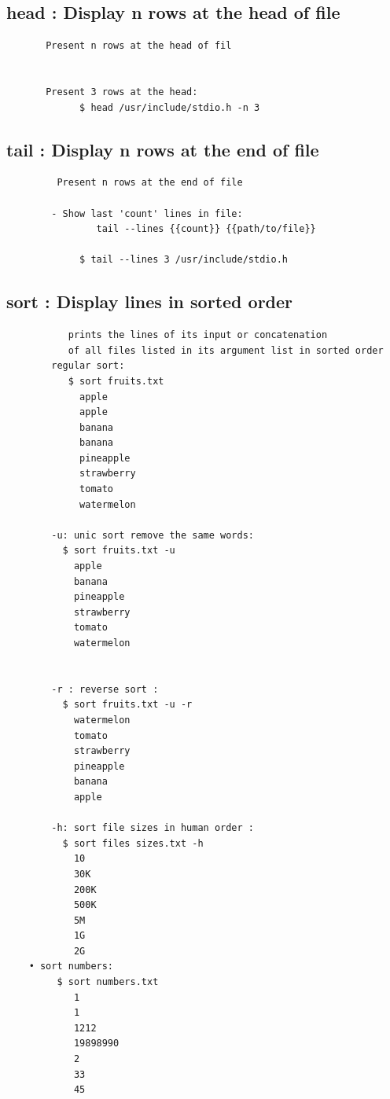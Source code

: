 \documentclass[a4paper,12pt]{article}
\begin{document}
\subsection{head     : Display n rows at the head of file }
\begin{verbatim}
       Present n rows at the head of fil
       
       
       Present 3 rows at the head:
             $ head /usr/include/stdio.h -n 3

\end{verbatim}

\subsection{tail     : Display n rows at the end of file }
\begin{verbatim}
         Present n rows at the end of file
        
        - Show last 'count' lines in file:
                tail --lines {{count}} {{path/to/file}}

             $ tail --lines 3 /usr/include/stdio.h

\end{verbatim}

\subsection{sort     : Display lines in sorted order}
\begin{verbatim}
           prints the lines of its input or concatenation 
           of all files listed in its argument list in sorted order
        regular sort:
           $ sort fruits.txt
             apple
             apple
             banana
             banana
             pineapple
             strawberry
             tomato
             watermelon

        -u: unic sort remove the same words: 
          $ sort fruits.txt -u
            apple
            banana
            pineapple
            strawberry
            tomato
            watermelon


        -r : reverse sort :
          $ sort fruits.txt -u -r
            watermelon
            tomato
            strawberry
            pineapple
            banana
            apple

        -h: sort file sizes in human order :
          $ sort files sizes.txt -h
            10
            30K
            200K
            500K
            5M
            1G
            2G
    • sort numbers: 
         $ sort numbers.txt
            1
            1
            1212
            19898990
            2
            33
            45
\end{verbatim}
\end{document}
